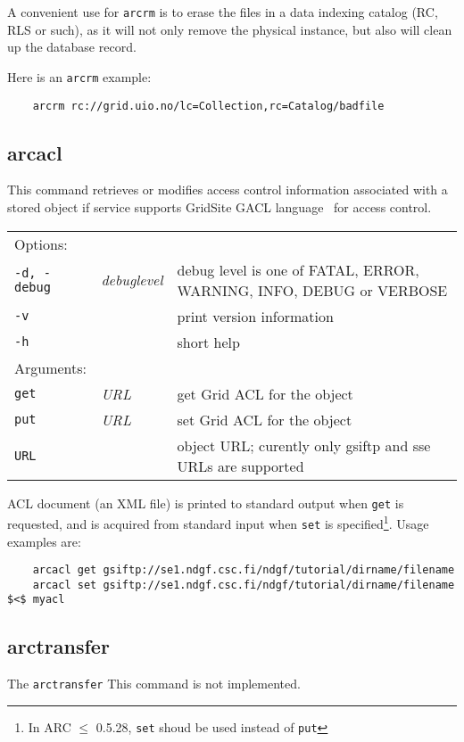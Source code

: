 \begin{framed}
   A convenient use for \texttt{arcrm} is to erase the files in a data
   indexing catalog (RC, RLS or such), as it will not only remove the
   physical instance, but also will clean up the database record.
\end{framed}

Here is an \texttt{arcrm} example:

\begin{verbatim}
    arcrm rc://grid.uio.no/lc=Collection,rc=Catalog/badfile
\end{verbatim}

\subsection{arcacl}\label{sec:arcacl}

This command retrieves or modifies
access control information associated with a stored object if service
supports GridSite GACL language~\cite{gacl} for access control.
\hspace*{0.5cm}
\begin{shaded}
\end{shaded}
\begin{longtable}{llp{8cm}}
   Options:&&\\
    \texttt{-d, -debug} & \textit{debuglevel} &debug level is one of  FATAL, ERROR, WARNING, INFO, DEBUG or VERBOSE\\
    \texttt{-v} && print version information\\
    \texttt{-h} && short help\\
   Arguments:&&\\
    \texttt{get} &\textit{URL}& get Grid ACL for the object\\
    \texttt{put} &\textit{URL}& set Grid ACL for the object\\
    \texttt{URL} && object URL; curently only gsiftp and sse URLs are supported\\
\end{longtable}

ACL document (an XML file) is printed to standard output when
\texttt{get} is requested, and is acquired from standard input when
\texttt{set} is specified\footnote{In ARC $\leq$ 0.5.28, \texttt{set}
  shoud be used instead of \texttt{put}}. Usage examples are:
\begin{verbatim}
    arcacl get gsiftp://se1.ndgf.csc.fi/ndgf/tutorial/dirname/filename
    arcacl set gsiftp://se1.ndgf.csc.fi/ndgf/tutorial/dirname/filename $<$ myacl
\end{verbatim}

\subsection{arctransfer}\label{sec:arctransfer}
The \texttt{arctransfer}
This command is not implemented.
